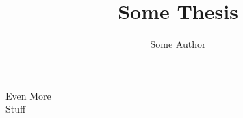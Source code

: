 \documentclass[hyper,AGBdraft,nobind,oneside,noroman]{hepthesis}
\begin{document}
\linenumbers 
\title{Some Thesis}
\author{Some Author}
   
\begin{frontmatter} 
{Even More \\ Stuff}

\end{frontmatter}
  
\begin{mainmatter}


\end{mainmatter}
    
% 

% 
% 
\end{document}
